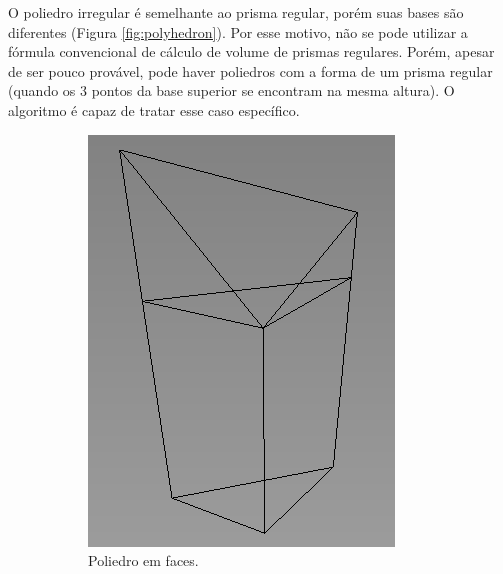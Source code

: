 O poliedro irregular é semelhante ao prisma regular, porém suas bases são diferentes (Figura \ref{fig:polyhedron}). Por esse motivo, não se pode utilizar a fórmula convencional de cálculo de volume de prismas regulares.  
Porém, apesar de ser pouco provável, pode haver poliedros com a forma de um prisma regular (quando os 3 pontos da base superior se encontram na mesma altura). 
O algoritmo é capaz de tratar esse caso específico.

\begin{figure}[H]
    \centering
    \caption{Exemplo de um poliedro irregular.}
    \begin{subfigure}[t]{0.25\textwidth}
        \includegraphics[width=\textwidth]{dados/figuras/pol_line.png}
        \caption{Poliedro em faces.}
        \label{fig:polyhedron1}
    \end{subfigure}
    \hspace{2em}
    \begin{subfigure}[t]{0.25\textwidth}

\end{subfigure}
\end{figure}
